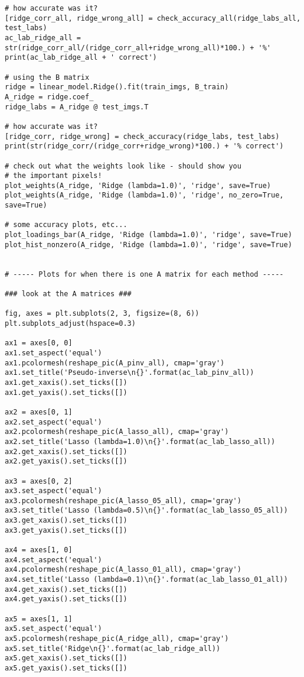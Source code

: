 \documentclass[10pt]{article}
\begin{document}
\begin{lstlisting}
# how accurate was it?
[ridge_corr_all, ridge_wrong_all] = check_accuracy_all(ridge_labs_all, test_labs)
ac_lab_ridge_all = str(ridge_corr_all/(ridge_corr_all+ridge_wrong_all)*100.) + '%'
print(ac_lab_ridge_all + ' correct')

# using the B matrix 
ridge = linear_model.Ridge().fit(train_imgs, B_train)
A_ridge = ridge.coef_
ridge_labs = A_ridge @ test_imgs.T

# how accurate was it?
[ridge_corr, ridge_wrong] = check_accuracy(ridge_labs, test_labs)
print(str(ridge_corr/(ridge_corr+ridge_wrong)*100.) + '% correct')

# check out what the weights look like - should show you 
# the important pixels!
plot_weights(A_ridge, 'Ridge (lambda=1.0)', 'ridge', save=True)
plot_weights(A_ridge, 'Ridge (lambda=1.0)', 'ridge', no_zero=True, save=True)

# some accuracy plots, etc...
plot_loadings_bar(A_ridge, 'Ridge (lambda=1.0)', 'ridge', save=True)
plot_hist_nonzero(A_ridge, 'Ridge (lambda=1.0)', 'ridge', save=True)


# ----- Plots for when there is one A matrix for each method -----

### look at the A matrices ###

fig, axes = plt.subplots(2, 3, figsize=(8, 6))
plt.subplots_adjust(hspace=0.3)

ax1 = axes[0, 0]
ax1.set_aspect('equal')
ax1.pcolormesh(reshape_pic(A_pinv_all), cmap='gray')
ax1.set_title('Pseudo-inverse\n{}'.format(ac_lab_pinv_all))
ax1.get_xaxis().set_ticks([])
ax1.get_yaxis().set_ticks([])

ax2 = axes[0, 1]
ax2.set_aspect('equal')
ax2.pcolormesh(reshape_pic(A_lasso_all), cmap='gray')
ax2.set_title('Lasso (lambda=1.0)\n{}'.format(ac_lab_lasso_all))
ax2.get_xaxis().set_ticks([])
ax2.get_yaxis().set_ticks([])

ax3 = axes[0, 2]
ax3.set_aspect('equal')
ax3.pcolormesh(reshape_pic(A_lasso_05_all), cmap='gray')
ax3.set_title('Lasso (lambda=0.5)\n{}'.format(ac_lab_lasso_05_all))
ax3.get_xaxis().set_ticks([])
ax3.get_yaxis().set_ticks([])

ax4 = axes[1, 0]
ax4.set_aspect('equal')
ax4.pcolormesh(reshape_pic(A_lasso_01_all), cmap='gray')
ax4.set_title('Lasso (lambda=0.1)\n{}'.format(ac_lab_lasso_01_all))
ax4.get_xaxis().set_ticks([])
ax4.get_yaxis().set_ticks([])

ax5 = axes[1, 1]
ax5.set_aspect('equal')
ax5.pcolormesh(reshape_pic(A_ridge_all), cmap='gray')
ax5.set_title('Ridge\n{}'.format(ac_lab_ridge_all))
ax5.get_xaxis().set_ticks([])
ax5.get_yaxis().set_ticks([])


\end{lstlisting}
\end{document}
